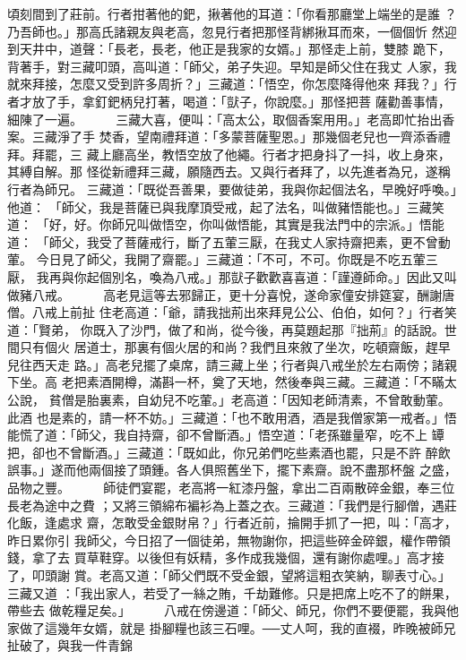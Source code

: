 \begin{pinyinscope}
{頃刻間到了莊前。行者拑著他的鈀，揪著他的耳道：「你看那廳堂上端坐的是誰
？乃吾師也。」那高氏諸親友與老高，忽見行者把那怪背綁揪耳而來，一個個忻
然迎到天井中，道聲：「長老，長老，他正是我家的女婿。」那怪走上前，雙膝
跪下，背著手，對三藏叩頭，高叫道：「師父，弟子失迎。早知是師父住在我丈
人家，我就來拜接，怎麼又受到許多周折？」三藏道：「悟空，你怎麼降得他來
拜我？」行者才放了手，拿釘鈀柄兒打著，喝道：「獃子，你說麼。」那怪把菩
薩勸善事情，細陳了一遍。
　　
三藏大喜，便叫：「高太公，取個香案用用。」老高即忙抬出香案。三藏淨了手
焚香，望南禮拜道：「多蒙菩薩聖恩。」那幾個老兒也一齊添香禮拜。拜罷，三
藏上廳高坐，教悟空放了他繩。行者才把身抖了一抖，收上身來，其縛自解。那
怪從新禮拜三藏，願隨西去。又與行者拜了，以先進者為兄，遂稱行者為師兄。
三藏道：「既從吾善果，要做徒弟，我與你起個法名，早晚好呼喚。」他道：
「師父，我是菩薩已與我摩頂受戒，起了法名，叫做豬悟能也。」三藏笑道：
「好，好。你師兄叫做悟空，你叫做悟能，其實是我法門中的宗派。」悟能道：
「師父，我受了菩薩戒行，斷了五葷三厭，在我丈人家持齋把素，更不曾動葷。
今日見了師父，我開了齋罷。」三藏道：「不可，不可。你既是不吃五葷三厭，
我再與你起個別名，喚為八戒。」那獃子歡歡喜喜道：「謹遵師命。」因此又叫
做豬八戒。
　　
高老見這等去邪歸正，更十分喜悅，遂命家僮安排筵宴，酬謝唐僧。八戒上前扯
住老高道：「爺，請我拙荊出來拜見公公、伯伯，如何？」行者笑道：「賢弟，
你既入了沙門，做了和尚，從今後，再莫題起那『拙荊』的話說。世間只有個火
居道士，那裏有個火居的和尚？我們且來敘了坐次，吃頓齋飯，趕早兒往西天走
路。」高老兒擺了桌席，請三藏上坐；行者與八戒坐於左右兩傍；諸親下坐。高
老把素酒開樽，滿斟一杯，奠了天地，然後奉與三藏。三藏道：「不瞞太公說，
貧僧是胎裏素，自幼兒不吃葷。」老高道：「因知老師清素，不曾敢動葷。此酒
也是素的，請一杯不妨。」三藏道：「也不敢用酒，酒是我僧家第一戒者。」悟
能慌了道：「師父，我自持齋，卻不曾斷酒。」悟空道：「老孫雖量窄，吃不上
罈把，卻也不曾斷酒。」三藏道：「既如此，你兄弟們吃些素酒也罷，只是不許
醉飲誤事。」遂而他兩個接了頭鍾。各人俱照舊坐下，擺下素齋。說不盡那杯盤
之盛，品物之豐。
　　
師徒們宴罷，老高將一紅漆丹盤，拿出二百兩散碎金銀，奉三位長老為途中之費
；又將三領綿布褊衫為上蓋之衣。三藏道：「我們是行腳僧，遇莊化飯，逢處求
齋，怎敢受金銀財帛？」行者近前，掄開手抓了一把，叫：「高才，昨日累你引
我師父，今日招了一個徒弟，無物謝你，把這些碎金碎銀，權作帶領錢，拿了去
買草鞋穿。以後但有妖精，多作成我幾個，還有謝你處哩。」高才接了，叩頭謝
賞。老高又道：「師父們既不受金銀，望將這粗衣笑納，聊表寸心。」三藏又道
：「我出家人，若受了一絲之賄，千劫難修。只是把席上吃不了的餅果，帶些去
做乾糧足矣。」
　　
八戒在傍邊道：「師父、師兄，你們不要便罷，我與他家做了這幾年女婿，就是
掛腳糧也該三石哩。──丈人呵，我的直裰，昨晚被師兄扯破了，與我一件青錦
}
\end{pinyinscope}
